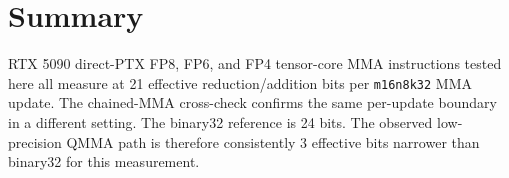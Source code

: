 \documentclass[11pt]{article}
\begin{document}
\section{Summary}

\begin{summarybox}
RTX 5090 direct-PTX FP8, FP6, and FP4 tensor-core MMA instructions tested here
all measure at 21 effective reduction/addition bits per \texttt{m16n8k32} MMA
update. The chained-MMA cross-check confirms the same per-update boundary in a
different setting. The binary32 reference is 24 bits. The observed
low-precision QMMA path is therefore consistently 3 effective bits narrower
than binary32 for this measurement.
\end{summarybox}
\end{document}
